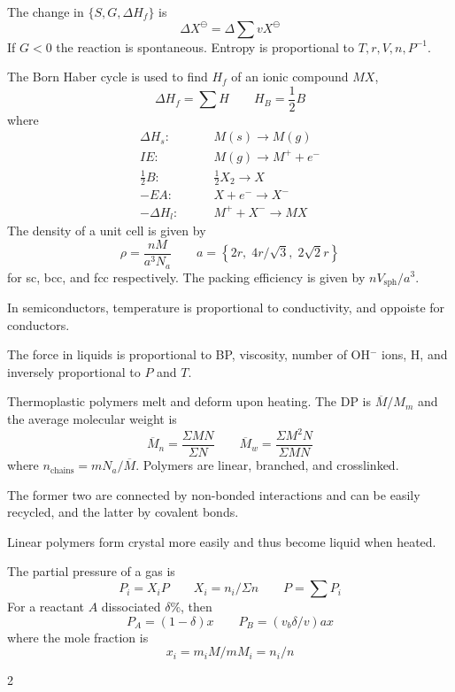 \documentclass{article}
\begin{document}
\begin{multicols*}{2}
\bigskip
The change in $\{S,G,\Delta H_f\}$ is
\begin{equation}
  \Delta X^\ominus = \Delta \sum v X^\ominus
\end{equation}
If $G < 0$ the reaction is spontaneous. Entropy is proportional to $T,r,V,n,P^{-1}$.

\bigskip
The Born Haber cycle is used to find $H_f$ of an ionic compound $MX$,
\begin{equation}
  \Delta H_f = \sum H \qquad H_B = \textstyle\frac{1}{2} B
\end{equation}
where
\begin{align}
  \Delta H_s: \qquad & M(s) \to M(g) \\
  IE: \qquad & M(g) \to M^+ + e^- \\
  \textstyle\frac{1}{2} B: \qquad & \textstyle\frac{1}{2} X_2 \to X \\
  -EA: \qquad & X + e^- \to X^- \\
  - \Delta H_l: \qquad & M^+ + X^- \to MX
\end{align}
The density of a unit cell is given by
\begin{equation}
  \rho = \frac{nM}{a^3 N_a} \qquad a = \left\{ 2r, \; 4r/\sqrt 3, \; 2 \sqrt 2 r  \right\}
\end{equation}
for sc, bcc, and fcc respectively. The packing efficiency is given by $n V_{\text{sph}} / a^3$.

\bigskip
In semiconductors, temperature is proportional to conductivity, and oppoiste for conductors.

\bigskip
The force in liquids is proportional to BP, viscosity, number of OH$^-$ ions, H, and inversely proportional to $P$ and $T$.

\bigskip
Thermoplastic polymers melt and deform upon heating. The DP is $\overline M / M_{m}$ and the average molecular weight is
\begin{equation}
  \overline M_n = \frac{\Sigma MN}{\Sigma N} \qquad \overline M_w = \frac{\Sigma M^2 N}{\Sigma MN}
\end{equation}
where $n_\text{chains} = m N_a / \overline M$. Polymers are linear, branched, and crosslinked.

\bigskip
The former two are connected by non-bonded interactions and can be easily recycled, and the latter by covalent bonds.

\bigskip
Linear polymers form crystal more easily and thus become liquid when heated.

\bigskip
The partial pressure of a gas is
\begin{equation}
  P_i = X_i P \qquad X_i = n_i / \Sigma n \qquad P = \sum P_i
\end{equation}
For a reactant $A$ dissociated $\delta \%$, then \begin{equation}
  P_A = (1-\delta)x \qquad P_B = (v_b \delta / v)a x
\end{equation}
where the mole fraction is
\begin{equation}
  x_i = m_i M / m M_i = n_i / n
\end{equation}

\end{multicols*}{2}
\end{document}
